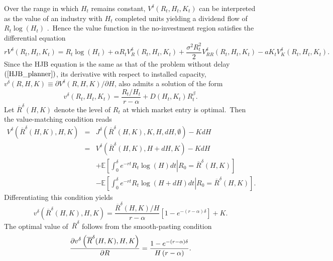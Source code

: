 \documentclass[12pt, a4paper]{article}
\begin{document}
Over the range in which $H_{t}$ remains constant, $V^{\delta }\left(
R_{t},H_{t},K_{t}\right) $ can be interpreted as the value of an industry
with $H_{t}$ completed units yielding a dividend flow of $R_{t}\log (H_{t})$%
.\ Hence the value function in the no-investment region satisfies the
differential equation%
\begin{equation*}
rV^{\delta }\left( R_{t},H_{t},K_{t}\right) =R_{t}\log (H_{t})+\alpha
R_{t}V_{R}^{\delta }\left( R_{t},H_{t},K_{t}\right) +\frac{\sigma
^{2}R_{t}^{2}}{2}V_{RR}^{\delta }\left( R_{t},H_{t},K_{t}\right)
-aK_{t}V_{K}^{\delta }\left( R_{t},H_{t},K_{t}\right) .
\end{equation*}%
Since the HJB equation is the same as that of the problem without delay $%
\left( \ref{HJB_planner}\right) $, its derivative with respect to installed
capacity, $v^{\delta }\left( R,H,K\right) \equiv \partial V^{\delta }\left(
R,H,K\right) /\partial H$, also admits a solution of the form%
\begin{equation}
v^{\delta }\left( R_{t},H_{t},K_{t}\right) =\frac{R_{t}/H_{t}}{r-\alpha }%
+D\left( H_{t},K_{t}\right) R_{t}^{\beta }.  \label{eq:V_T2B}
\end{equation}%
Let $\overline{R}^{\delta }(H,K)$ denote the level of $R_{t}$ at which
market entry is optimal.\ Then the value-matching condition reads%
\begin{eqnarray*}
V^{\delta }\left( \overline{R}^{\delta }(H,K),H,K\right)  &=&J^{\delta
}\left( \overline{R}^{\delta }(H,K),K,H,dH,\emptyset \right) -KdH \\
&=&V^{\delta }\left( \overline{R}^{\delta }(H,K),H+dH,K\right) -KdH \\
&&+\mathbb{E}\left[ \left. \int_{0}^{\delta }e^{-rt}R_{t}\log
(H)dt\right\vert R_{0}=\overline{R}^{\delta }(H,K)\right]  \\
&&-\mathbb{E}\left[ \left. \int_{0}^{\delta }e^{-rt}R_{t}\log
(H+dH)dt\right\vert R_{0}=\overline{R}^{\delta }(H,K)\right] .
\end{eqnarray*}%
Differentiating this condition yields%
\begin{equation}
v^{\delta }\left( \overline{R}^{\delta }(H,K),H,K\right) =\frac{\overline{R}%
^{\delta }(H,K)/H}{r-\alpha }\left[ 1-e^{-\left( r-\alpha \right) \delta }%
\right] +K.  \label{eq:VM_T2B}
\end{equation}%
The optimal value of\ $\overline{R}^{\delta }$ follows from the
smooth-pasting condition%
\begin{equation}
\frac{\partial v^{\delta }\left( \overline{R}^{\delta }(H,K),H,K\right) }{%
\partial R}=\frac{1-e^{-\left( r-\alpha \right) \delta }}{H\left( r-\alpha
\right) }.  \label{eq:SC_T2B}
\end{equation}
\end{document}
